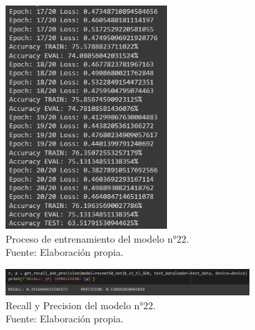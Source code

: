 \begin{figure}[H]
	\begin{center}
		\includegraphics[width=0.55\textwidth]{4/figures/model22_train.PNG}
		\caption[Proceso de entrenamiento del modelo n°22]{Proceso de entrenamiento del modelo n°22. \\
		Fuente: Elaboración propia.}
		\label{4:fig162}
	\end{center}
\end{figure}

\begin{figure}[H]
	\begin{center}
		\includegraphics[width=0.83\textwidth]{4/figures/model22_rp.PNG}
		\caption[Recall y Precision del modelo n°22]{Recall y Precision del modelo n°22. \\
		Fuente: Elaboración propia.}
		\label{4:fig163}
	\end{center}
\end{figure}

